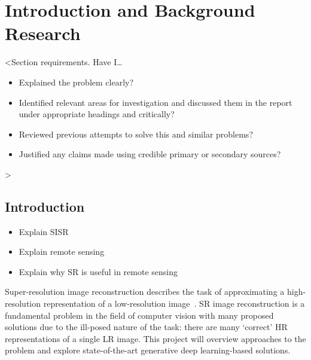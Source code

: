 \chapter{Introduction and Background Research}

\label{chapter1}

<Section requirements. Have I\dots
\begin{itemize}
    \item Explained the problem clearly?
    \item Identified relevant areas for investigation and discussed them in the report under appropriate headings and critically?
    \item Reviewed previous attempts to solve this and similar problems?
    \item Justified any claims made using credible primary or secondary sources?
\end{itemize}
>

\section{Introduction}

\begin{itemize}
    \item Explain SISR
    \item Explain remote sensing
    \item Explain why SR is useful in remote sensing
\end{itemize}

Super-resolution image reconstruction describes the task of approximating a high-resolution representation of a low-resolution image~\cite{superResOverview}. SR image reconstruction is a fundamental problem in the field of computer vision with many proposed solutions due to the ill-posed nature of the task: there are many `correct' HR representations of a single LR image. This project will overview approaches to the problem and explore state-of-the-art generative deep learning-based solutions.


